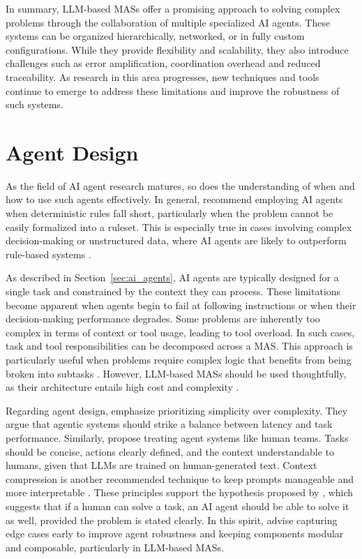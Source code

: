 \documentclass[a4paper,oneside,bibliography=totoc]{scrbook}
\begin{document}
In summary, \ac{LLM}-based \acp{MAS} offer a promising approach to solving complex problems through the collaboration of multiple specialized \ac{AI} agents. These systems can be organized hierarchically, networked, or in fully custom configurations. While they provide flexibility and scalability, they also introduce challenges such as error amplification, coordination overhead and reduced traceability. As research in this area progresses, new techniques and tools continue to emerge to address these limitations and improve the robustness of such systems.

\section{Agent Design}
\label{sec:agent_design}

As the field of \ac{AI} agent research matures, so does the understanding of when and how to use such agents effectively. In general, \citet{OpenAI2025} recommend employing \ac{AI} agents when deterministic rules fall short, particularly when the problem cannot be easily formalized into a ruleset. This is especially true in cases involving complex decision-making or unstructured data, where \ac{AI} agents are likely to outperform rule-based systems \cite{OpenAI2025}.

As described in Section~\ref{sec:ai_agents}, \ac{AI} agents are typically designed for a single task and constrained by the context they can process. These limitations become apparent when agents begin to fail at following instructions or when their decision-making performance degrades. Some problems are inherently too complex in terms of context or tool usage, leading to tool overload. In such cases, task and tool responsibilities can be decomposed across a \ac{MAS}. This approach is particularly useful when problems require complex logic that benefits from being broken into subtasks \cite{OpenAI2025,LangChain2025b}. However, \ac{LLM}-based \acp{MAS} should be used thoughtfully, as their architecture entails high cost and complexity \cite{Hadfield2025}.

Regarding agent design, \citet{Anthropic2024} emphasize prioritizing simplicity over complexity. They argue that agentic systems should strike a balance between latency and task performance. Similarly, \citet{Hadfield2025} propose treating agent systems like human teams. Tasks should be concise, actions clearly defined, and the context understandable to humans, given that \acp{LLM} are trained on human-generated text. Context compression is another recommended technique to keep prompts manageable and more interpretable \cite{Hadfield2025}. These principles support the hypothesis proposed by \citet{Anthropic2024}, which suggests that if a human can solve a task, an \ac{AI} agent should be able to solve it as well, provided the problem is stated clearly. In this spirit, \citet{OpenAI2025} advise capturing edge cases early to improve agent robustness and keeping components modular and composable, particularly in \ac{LLM}-based \acp{MAS}.
\end{document}
